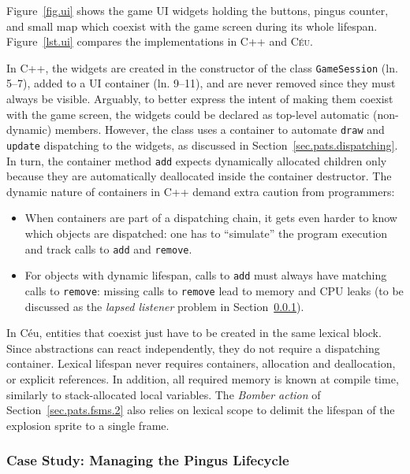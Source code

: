\documentclass{vgtc}                          %
\newcommand{\CEU}{\textsc{C\'{e}u}\xspace}
\newcommand{\code}[1] {{\small{\texttt{#1}}}}
\begin{document}
Figure~\ref{fig.ui} shows the game UI widgets holding the buttons, pingus
counter, and small map which coexist with the game screen during its whole
lifespan.
%
Figure~\ref{lst.ui} compares the implementations in C++ and \CEU.

In C++, the widgets are created in the constructor of the class
\code{GameSession} (ln. 5--7), added to a UI container (ln. 9--11), and are
never removed since they must always be visible.
Arguably, to better express the intent of making them coexist with the game
screen, the widgets could be declared as top-level automatic (non-dynamic)
members.
However, the class uses a container to automate \code{draw} and \code{update}
dispatching to the widgets, as discussed in Section~\ref{sec.pats.dispatching}.
In turn, the container method \code{add} expects dynamically allocated children
only because they are automatically deallocated inside the container
destructor.
%
The dynamic nature of containers in C++ demand extra caution from programmers:
%
\begin{itemize}
\item When containers are part of a dispatching chain, it gets even harder to
      know which objects are dispatched:
      one has to ``simulate'' the program execution and track calls to
      \code{add} and \code{remove}.
\item For objects with dynamic lifespan, calls to \code{add} must always have
      matching calls to \code{remove}:
      missing calls to \code{remove} lead to memory and CPU leaks (to be
      discussed as the \emph{lapsed listener} problem in
      Section~\ref{sec.pats.lifespan.2}).
\end{itemize}

In Céu, entities that coexist just have to be created in the same lexical
block.
%
Since abstractions can react independently, they do not require a dispatching
container.
%
Lexical lifespan never requires containers, allocation and deallocation, or
explicit references.
In addition, all required memory is known at compile time, similarly to
stack-allocated local variables.
%
The \emph{Bomber action} of Section~\ref{sec.pats.fsms.2} also relies on
lexical scope to delimit the lifespan of the explosion sprite to a single
frame.

\subsubsection{Case Study: Managing the Pingus Lifecycle}
\label{sec.pats.lifespan.2}
\end{document}
